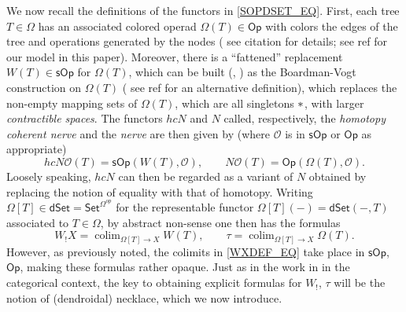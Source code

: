 \documentclass[a4paper,10pt
,draft
]{article}%
\numberwithin{equation}{section}
\numberwithin{figure}{section}
\theoremstyle{definition} %
\newcommand{\Op}{\mathsf{Op}}%
\newcommand{\sOp}{\ensuremath{\mathsf{sOp}}}%
\DeclareMathOperator{\colim}{colim}%
\renewcommand{\O}{\ensuremath{\mathcal O}}
\newcommand{\1}{\ensuremath{\mathbbm 1}}%
\begin{document}
We now recall the definitions of the functors in
\eqref{SOPDSET_EQ}.
First, each tree $T \in \Omega$
has an associated colored operad
$\Omega(T) \in \mathsf{Op}$
with colors the edges of the tree and 
operations generated by the nodes
{(\color{red} see citation for details;
	see ref for our model in this paper)}.
Moreover, there is a ``fattened'' replacement 
$W(T) \in \sOp$ for $\Omega(T)$,
which can be built 
(\cite[Rem. 7.3]{MW09}, \cite[(4.2.1)]{CM13b})
as the Boardman-Vogt construction on
$\Omega(T)$
{(\color{red} see ref for an alternative definition)},
which replaces the non-empty mapping sets of 
$\Omega(T)$, which are all singletons $\**$,
with larger \emph{contractible spaces}.
The functors $hcN$ and $N$ called, respectively,
the \emph{homotopy coherent nerve}
and the \emph{nerve}
are then given by (where $\O$ is in $\sOp$ or $\Op$ as appropriate)
\begin{equation}\label{TWONER EQ}
	hcN \O(T) = \sOp(W(T),\O),
	\qquad
	N \O(T) = \Op(\Omega(T),\O).
\end{equation}
Loosely speaking, $hcN$ can then be regarded as a variant of $N$
obtained by replacing the notion of equality with that of homotopy.
Writing 
$\Omega[T]\in \mathsf{dSet} = \mathsf{Set}^{\Omega^{op}}$
for the representable functor
$\Omega[T](-) = \mathsf{dSet}(-,T)$
associated to $T \in \Omega$,
by abstract non-sense one then has the formulas
\begin{equation}\label{WXDEF_EQ}
	W_!X = \colim_{\Omega[T] \to X} W(T),
\qquad
	\tau = \colim_{\Omega[T] \to X} \Omega(T).
\end{equation}
However, as previously noted, 
the colimits in \eqref{WXDEF_EQ}
take place in $\sOp$, $\Op$,
making these formulas rather opaque.
Just as in the work in \cite{DS11} in the categorical context,
the key to obtaining explicit formulas for
$W_!$, $\tau$ will be the notion of (dendroidal) necklace,
which we now introduce.
\end{document}
